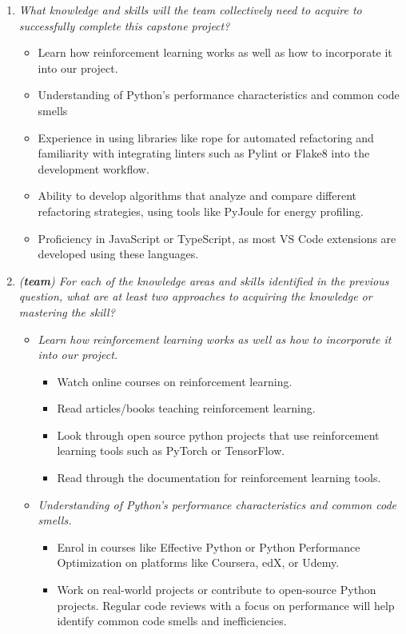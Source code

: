 \documentclass[12pt]{article}
\begin{document}
\begin{enumerate}[wide=0pt, leftmargin=*]
  \item \textit{What knowledge and skills will the team collectively need to acquire to successfully complete this capstone project?}

    \begin{itemize}
      \item Learn how reinforcement learning works as well as how to incorporate it into our project.
      \item Understanding of Python's performance characteristics and common code smells
      \item Experience in using libraries like rope for automated refactoring and familiarity with integrating linters such as Pylint or Flake8 into the development workflow.
      \item Ability to develop algorithms that analyze and compare different refactoring strategies, using tools like PyJoule for energy profiling.
      \item Proficiency in JavaScript or TypeScript, as most VS Code extensions are developed using these languages.
    \end{itemize}

  \item \textit{(\textbf{team}) For each of the knowledge areas and skills identified in the previous question, what are at least two approaches to acquiring the knowledge or mastering the skill?}

    \begin{itemize}
      \item \textit{Learn how reinforcement learning works as well as how to incorporate it into our project.}
      \begin{itemize}
        \item Watch online courses on reinforcement learning.
        \item Read articles/books teaching reinforcement learning.
        \item Look through open source python projects that use reinforcement learning tools such as PyTorch or TensorFlow.
        \item Read through the documentation for reinforcement learning tools.
      \end{itemize}
      
      \item \textit{Understanding of Python's performance characteristics and common code smells.}
      \begin{itemize}
        \item Enrol in courses like Effective Python or Python Performance Optimization on platforms like Coursera, edX, or Udemy.
        \item Work on real-world projects or contribute to open-source Python projects. Regular code reviews with a focus on performance 
        will help identify common code smells and inefficiencies.
      \end{itemize}
      

\end{itemize}
\end{enumerate}
\end{document}

